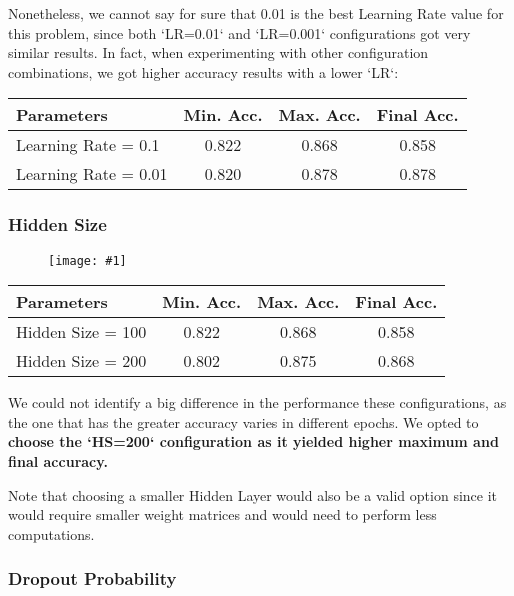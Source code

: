 \documentclass[10pt]{article}
\newcommand{\img}[1]{\begin{figure}[H]\centering\texttt{[image: \#1]}\end{figure}}
\begin{document}
Nonetheless, we cannot say for sure that 0.01 is the best Learning Rate value for this problem, since both `LR=0.01` and `LR=0.001` configurations got very similar results.
In fact, when experimenting with other configuration combinations, we got higher accuracy results with a lower `LR`:

\begin{center}
\begin{tabular}{||l|c|c|c||}
\hline
Parameters           & Min. Acc. & Max. Acc. & Final Acc. \\
\hline\hline
Learning Rate = 0.1  & 0.822     & 0.868     & 0.858      \\
\hline
Learning Rate = 0.01 & 0.820     & 0.878     & 0.878      \\
\hline
\end{tabular}
\end{center}

\subsubsection{Hidden Size}

\img{tuning/hidden_layer_size.png}


\begin{center}
\begin{tabular}{||l|c|c|c||}
\hline
Parameters        & Min. Acc. & Max. Acc. & Final Acc. \\
\hline\hline
Hidden Size = 100 & 0.822     & 0.868     & 0.858      \\
\hline
Hidden Size = 200 & 0.802     & 0.875     & 0.868      \\
\hline
\end{tabular}
\end{center}

We could not identify a big difference in the performance these configurations, as the one that has the greater accuracy varies in different epochs.
We opted to \textbf{choose the `HS=200` configuration as it yielded higher maximum and final accuracy.}

Note that choosing a smaller Hidden Layer would also be a valid option since it would require smaller weight matrices and would need to perform less computations.


\subsubsection{Dropout Probability}
\end{document}
